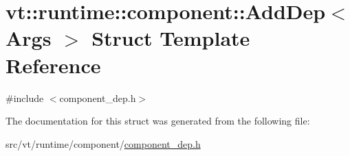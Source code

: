 \hypertarget{structvt_1_1runtime_1_1component_1_1_add_dep}{}\section{vt\+:\+:runtime\+:\+:component\+:\+:Add\+Dep$<$ Args $>$ Struct Template Reference}
\label{structvt_1_1runtime_1_1component_1_1_add_dep}


{\ttfamily \#include $<$component\+\_\+dep.\+h$>$}



The documentation for this struct was generated from the following file\+:\begin{DoxyCompactItemize}
\item 
src/vt/runtime/component/\hyperlink{component__dep_8h}{component\+\_\+dep.\+h}\end{DoxyCompactItemize}
